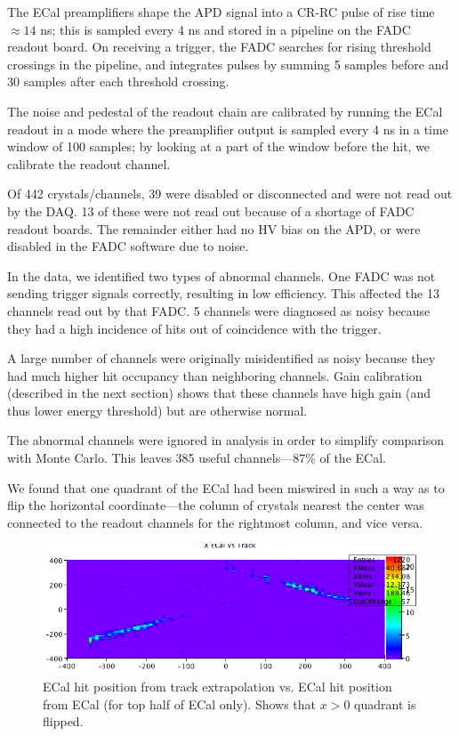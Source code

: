 
\vspace{1cm}{\bf ECal performance [Sho]}

The ECal preamplifiers shape the APD signal into a CR-RC pulse of rise time $\approx 14$ ns; this is sampled every 4 ns and stored in a pipeline on the FADC readout board.
On receiving a trigger, the FADC searches for rising threshold crossings in the pipeline, and integrates pulses by summing 5 samples before and 30 samples after each threshold crossing.

The noise and pedestal of the readout chain are calibrated by running the ECal readout in a mode where the preamplifier output is sampled every 4 ns in a time window of 100 samples; by looking at a part of the window before the hit, we calibrate the readout channel.

Of 442 crystals/channels, 39 were disabled or disconnected and were not read out by the DAQ. 
13 of these were not read out because of a shortage of FADC readout boards.
The remainder either had no HV bias on the APD, or were disabled in the FADC software due to noise.

In the data, we identified two types of abnormal channels. 
One FADC was not sending trigger signals correctly, resulting in low efficiency. This affected the 13 channels read out by that FADC.
5 channels were diagnosed as noisy because they had a high incidence of hits out of coincidence with the trigger.

A large number of channels were originally misidentified as noisy because they had much higher hit occupancy than neighboring channels.
Gain calibration (described in the next section) shows that these channels have high gain (and thus lower energy threshold) but are otherwise normal.

The abnormal channels were ignored in analysis in order to simplify comparison with Monte Carlo. This leaves 385 useful channels---87\% of the ECal.

We found that one quadrant of the ECal had been miswired in such a way as to flip the horizontal coordinate---the column of crystals nearest the center was connected to the readout channels for the rightmost column, and vice versa.

\begin{figure}[ht]
	\includegraphics[width=\textwidth]{test2012/ecalperformance/x_match_flip}
	\caption{\small{ECal hit position from track extrapolation vs. ECal hit position from ECal (for top half of ECal only). Shows that $x>0$ quadrant is flipped.}}
	\label{fig:x_flip}
\end{figure}

